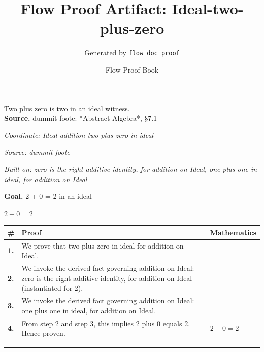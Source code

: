 \documentclass[11pt]{article}
\title{Flow Proof Artifact: Ideal-two-plus-zero}
\author{Generated by \texttt{flow doc proof}}
\date{Flow Proof Book}
\theoremstyle{definition}
\begin{document}
\maketitle
Two plus zero is two in an ideal witness.\\[0.5em]
\textbf{Source.} dummit-foote: *Abstract Algebra*, §7.1\\[0.5em]
\bigskip
{}\par
\smallskip\noindent\textit{Coordinate: Ideal \cdot addition \cdot two plus zero in ideal}\par
\smallskip\noindent\textit{Source: dummit-foote}\par
\smallskip\noindent\textit{Built on: zero is the right additive identity, for addition on Ideal, one plus one in ideal, for addition on Ideal}\par
\medskip
\noindent\textbf{Goal.} 2 + 0 = 2 in an ideal\par
\noindent$\displaystyle 2 + 0 = 2$\par
\medskip
\noindent
\begin{tabular}{@{} >{\raggedright\arraybackslash}p{} >{\raggedright\arraybackslash}p{} >{\raggedleft\arraybackslash}p{} @{}}
\textbf{\#} & \textbf{Proof} & \textbf{Mathematics} \\
\midrule
\textbf{1.} & We prove that two plus zero in ideal for addition on Ideal. & \\[0.45em]
\textbf{2.} & We invoke the derived fact governing addition on Ideal: zero is the right additive identity, for addition on Ideal (instantiated for 2). & \\[0.45em]
\textbf{3.} & We invoke the derived fact governing addition on Ideal: one plus one in ideal, for addition on Ideal. & \\[0.45em]
\textbf{4.} & From step 2 and step 3, this implies 2 plus 0 equals 2. Hence proven. & $\displaystyle 2 + 0 = 2$ \\[0.45em]
\bottomrule
\end{tabular}
\label{thm:Ideal-addition-two_plus_zero_in_ideal}
\par\medskip\hrule
\end{document}
